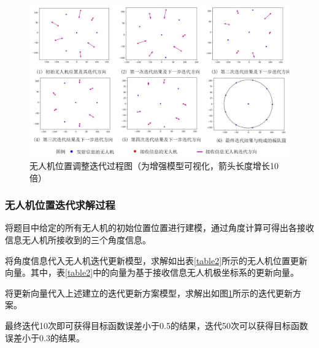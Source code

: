 \documentclass{my_paper}
\begin{document}
\begin{figure}[h]
    \centering
    \includegraphics[width=1\textwidth]{diedai.jpg}
    \caption{无人机位置调整迭代过程图（为增强模型可视化，箭头长度增长10倍）}
    \label{diedai}
\end{figure}


\subsubsection{无人机位置迭代求解过程}
将题目中给定的所有无人机的初始位置位置进行建模，通过角度计算可得出各接收信息无人机所接收到的三个角度信息。

将角度信息代入无人机迭代更新模型，求解如出表\ref{table2}所示的无人机位置更新向量。其中，表\ref{table2}中的向量为基于接收信息无人机极坐标系的更新向量。

将更新向量代入上述建立的迭代更新方案模型，求解出如图\ref{diedai}所示的迭代更新方案。

最终迭代10次即可获得目标函数误差小于0.5的结果，迭代50次可以获得目标函数误差小于0.3的结果。
\end{document}
